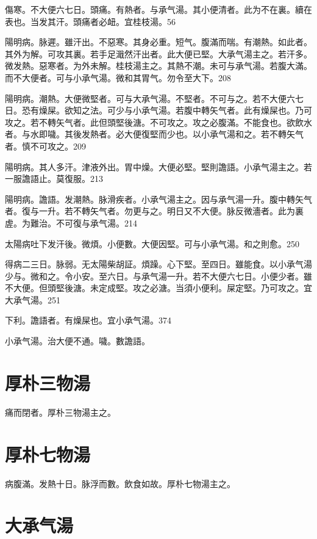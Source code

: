 \documentclass[b5paper,twoside,zihao=-4,UTF8]{ctexbook}
\begin{document}
傷寒。不大便六七日。頭痛。有熱者。与承气湯。其小便清者。此为不在裏。續在表也。当发其汗。頭痛者必衄。宜桂枝湯。56

陽明病。脉遲。雖汗出。不惡寒。其身必重。短气。腹滿而喘。有潮熱。如此者。其外为解。可攻其裏。若手足濈然汗出者。此大便已堅。{大}承气湯主之。若汗多。微发熱。惡寒者。为外未解。{桂枝湯主之。}其熱不潮。未可与承气湯。若腹大滿。而不大便者。可与小承气湯。微和其胃气。勿令至大下。208

陽明病。潮熱。大便微堅者。可与{大}承气湯。不堅者。不可与之。若不大便六七日。恐有燥屎。欲知之法。可少与小承气湯。若腹中轉矢气者。此有燥屎也。乃可攻之。若不轉矢气者。此但頭堅後溏。不可攻之。攻之必腹滿。不能食也。欲飲水者。与水即噦。其後发熱者。必大便復堅而少也。以小承气湯和之。若不轉矢气者。慎不可攻之。209

陽明病。其人多汗。津液外出。胃中燥。大便必堅。堅則譫語。{小}承气湯主之。{若一服譫語止。莫復服。}213

陽明病。譫語。发潮熱。脉滑疾者。{小}承气湯主之。因与承气湯一升。腹中轉矢气者。復与一升。若不轉矢气者。勿更与之。明日又不大便。脉反微濇者。此为裏虗。为難治。不可復与承气湯。214

太陽病吐下发汗後。微煩。小便數。大便因堅。可与小承气湯。和之則愈。250

得病二三日。脉弱。无太陽柴胡証。煩躁。心下堅。至四日。雖能食。以{小}承气湯少与。微和之。令小安。至六日。与承气湯一升。若不大便六七日。小便少者。雖不大便。但頭堅後溏。未定成堅。攻之必溏。当須小便利。屎定堅。乃可攻之。宜{大}承气湯。251

下利。譫語者。有燥屎也。宜{小}承气湯。374

小承气湯。治大便不通。噦。數譫語。

\section{厚朴三物湯}

痛而閉者。厚朴三物湯主之。

\section{厚朴七物湯}

病腹滿。发熱十日。脉浮而數。飲食如故。厚朴七物湯主之。

\section{大承气湯}
\end{document}
